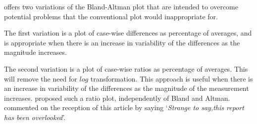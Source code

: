 \documentclass[Main.tex]{subfiles}
\begin{document}
	
	

	
\citet{BA99} offers two variations of the Bland-Altman plot that are intended to overcome potential problems that the conventional
plot would inappropriate for. 

The first variation is a plot of case-wise differences as percentage of averages, and is appropriate when there is an increase in variability of the differences as the magnitude increases. 

The second variation is a
plot of case-wise ratios as percentage of averages. This will remove the need for $log$ transformation. This approach is useful when there is an increase in variability of the differences as the magnitude of the measurement increases. \citet{Eksborg} proposed such a ratio plot, independently of Bland and Altman. \citet{Dewitte} commented on the reception of this article by
saying `\textit{Strange to say,this report has been overlooked}'.

	
	
\end{document}
